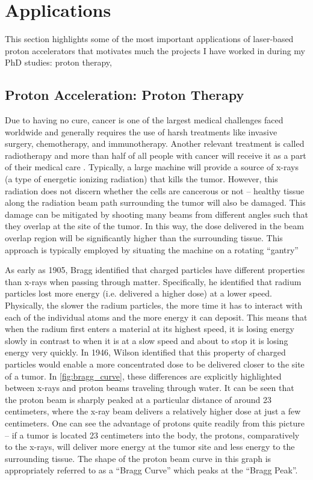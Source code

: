 \section{Applications}

This section highlights some of the most important applications of laser-based proton accelerators that motivates much the projects I have worked in during my PhD studies: proton therapy, 


\subsection{Proton Acceleration: Proton Therapy}

Due to having no cure, cancer is one of the largest medical challenges faced worldwide and generally requires the use of harsh treatments like invasive surgery, chemotherapy, and immunotherapy. Another relevant treatment is called radiotherapy and more than half of all people with cancer will receive it as a part of their medical care \cite{Mayo_2024_Cancer}. Typically, a large machine will provide a source of x-rays (a type of energetic ionizing radiation) that kills the tumor. However, this radiation does not discern whether the cells are cancerous or not -- healthy tissue along the radiation beam path surrounding the tumor will also be damaged. This damage can be mitigated by shooting many beams from different angles such that they overlap at the site of the tumor. In this way, the dose delivered in the beam overlap region will be significantly higher than the surrounding tissue. This approach is typically employed by situating the machine on a rotating ``gantry''

As early as 1905, Bragg \cite{Bragg_1905_JOS} identified that charged particles have different properties than x-rays when passing through matter. Specifically, he identified that radium particles lost more energy (i.e. delivered a higher dose) at a lower speed. Physically, the slower the radium particles, the more time it has to interact with each of the individual atoms and the more energy it can deposit. This means that when the radium first enters a material at its highest speed, it is losing energy slowly in contrast to when it is at a slow speed and about to stop it is losing energy very quickly. In 1946, Wilson \cite{Wilson_1946_Rad} identified that this property of charged particles would enable a more concentrated dose to be delivered closer to the site of a tumor. In \autoref{fig:bragg_curve}, these differences are explicitly highlighted between x-rays and proton beams traveling through water. It can be seen that the proton beam is sharply peaked at a particular distance of around 23 centimeters, where the x-ray beam delivers a relatively higher dose at just a few centimeters. One can see the advantage of protons quite readily from this picture -- if a tumor is located 23 centimeters into the body, the protons, comparatively to the x-rays, will deliver more energy at the tumor site and less energy to the surrounding tissue. The shape of the proton beam curve in this graph is appropriately referred to as a ``Bragg Curve'' which peaks at the ``Bragg Peak''. 

